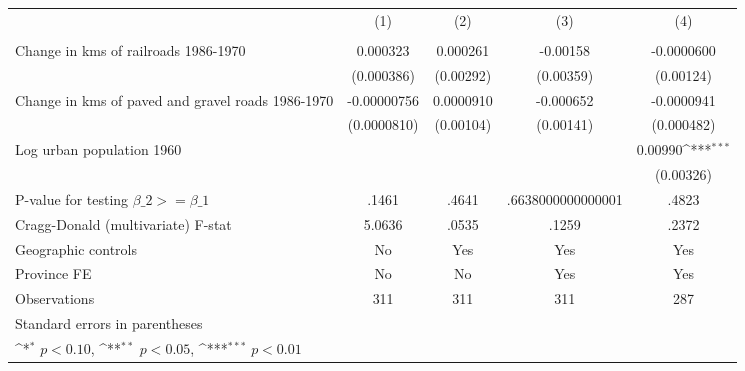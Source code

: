 {
\def\sym#1{\ifmmode^{#1}\else\(^{#1}\)\fi}
\begin{tabular}{l*{4}{c}}
\hline\hline
                &\multicolumn{1}{c}{(1)}&\multicolumn{1}{c}{(2)}&\multicolumn{1}{c}{(3)}&\multicolumn{1}{c}{(4)}\\
                &\multicolumn{1}{c}{}&\multicolumn{1}{c}{}&\multicolumn{1}{c}{}&\multicolumn{1}{c}{}\\
\hline
Change in kms of railroads 1986-1970& 0.000323         & 0.000261         & -0.00158         &-0.0000600         \\
                &(0.000386)         &(0.00292)         &(0.00359)         &(0.00124)         \\
[1em]
Change in kms of paved and gravel roads 1986-1970&-0.00000756         &0.0000910         &-0.000652         &-0.0000941         \\
                &(0.0000810)         &(0.00104)         &(0.00141)         &(0.000482)         \\
[1em]
Log urban population 1960&                  &                  &                  &  0.00990\sym{***}\\
                &                  &                  &                  &(0.00326)         \\
\hline
P-value for testing $\beta\_{2} >= \beta\_{1}$&    .1461         &    .4641         &.6638000000000001         &    .4823         \\
Cragg-Donald (multivariate) F-stat&   5.0636         &    .0535         &    .1259         &    .2372         \\
Geographic controls&       No         &      Yes         &      Yes         &      Yes         \\
Province FE     &       No         &       No         &      Yes         &      Yes         \\
Observations    &      311         &      311         &      311         &      287         \\
\hline\hline
\multicolumn{5}{l}{\footnotesize Standard errors in parentheses}\\
\multicolumn{5}{l}{\footnotesize \sym{*} \(p<0.10\), \sym{**} \(p<0.05\), \sym{***} \(p<0.01\)}\\
\end{tabular}
}
